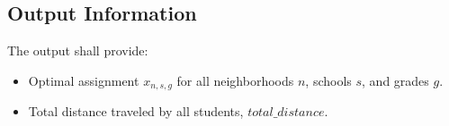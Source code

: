 \documentclass{article}
\begin{document}
\subsection*{Output Information}
The output shall provide:
\begin{itemize}
    \item Optimal assignment \( x_{n,s,g} \) for all neighborhoods \( n \), schools \( s \), and grades \( g \).
    \item Total distance traveled by all students, \( total\_distance \).
\end{itemize}
\end{document}
